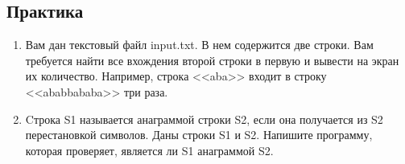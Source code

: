 \documentclass[12pt]{article}
\begin{document}
\subsection*{Практика}
\begin{enumerate}
\item Вам дан текстовый файл input.txt. В нем содержится две строки. Вам требуется найти все вхождения второй строки в первую и вывести на экран их количество. Например, строка <<aba>> входит в строку <<ababbababa>> три раза.

\item Cтрока S1 называется анаграммой строки S2, если она получается из S2 перестановкой символов. Даны строки S1 и S2. Напишите программу, которая проверяет, является ли S1 анаграммой S2.
\end{enumerate}
\end{document}
